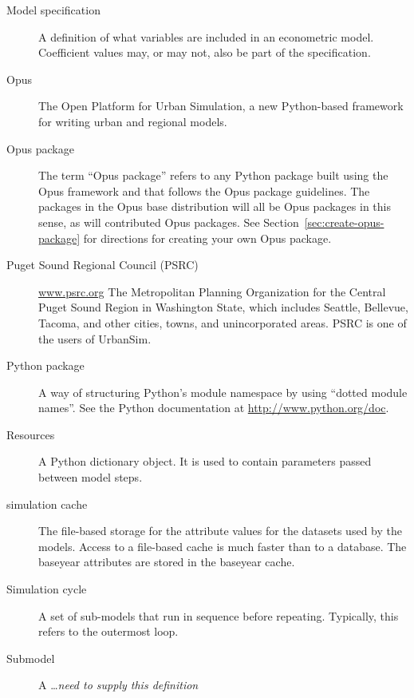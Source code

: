 \begin{description}
\item[Model specification] 
A definition of what variables are included in an econometric
model.  Coefficient values may, or may not, also be part of the
specification.

\item[Opus]  The Open Platform for Urban Simulation, a new
Python-based framework for writing urban and regional models.

\item[Opus package]  The term ``Opus package'' refers to 
any Python package built using the Opus framework and that follows
the Opus package guidelines.  The packages in the Opus base distribution
will all be Opus packages in this sense, as will contributed Opus packages. See
Section~\ref{sec:create-opus-package} for directions for creating your own Opus
package. 

\item[Puget Sound Regional Council (PSRC)]
\url{www.psrc.org}
The Metropolitan Planning Organization for the Central Puget Sound Region in Washington
State, which includes Seattle, Bellevue, Tacoma, and other cities, towns, and unincorporated 
areas.  PSRC is one of the users of UrbanSim. 

\item[Python package]
A way of structuring Python's module namespace by using ``dotted module
names''.  See the Python documentation at \url{http://www.python.org/doc}.

\item[Resources]  
A Python dictionary object.  It is used to contain parameters passed
between model steps.

\item[simulation cache]
The file-based storage for the attribute values for the datasets used by the
models. Access to a file-based cache is much faster than to a database.  The
baseyear attributes are stored in the baseyear cache.

\item[]\item[Simulation cycle] 
A set of sub-models that run in sequence before repeating.
Typically, this refers to the outermost loop.

\item[Submodel] 
A \ldots \emph{need to supply this definition}


\end{description}
